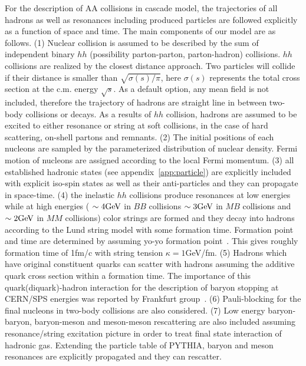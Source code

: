 \documentclass[]{article}
\newcommand{\srt}{\mbox{$\sqrt{s}$}}
\def\GeV{\mbox{\rm GeV}}
\begin{document}
For the description of AA collisions in  cascade model,
 the trajectories of all hadrons as well as resonances
 including produced particles are followed explicitly
   as a function of space and time.
The main components of our model are as follows.
(1)  Nuclear collision is assumed to be described by the
   sum of independent binary $hh$ 
   (possibility parton-parton, parton-hadron)
   collisions.
   $hh$ collisions are realized by the closest distance approach.
  Two particles will collide if their distance is smaller than
  $\sqrt{\sigma(s)/\pi}$, here $\sigma(s)$ represents the total cross
  section at the c.m. energy $\srt$.
  As a default option, any mean field is not included, therefore 
  the trajectory of hadrons are straight line in between two-body
  collisions or decays.
  As a results of $hh$ collision, hadrons are assumed to be
  excited to either resonance or string at soft collisions,
  in the case of hard scattering, on-shell partons and remnants.
(2) The initial positions of each nucleons are sampled by the
    parameterized distribution of nuclear density.
   Fermi motion of nucleons are assigned
   according to the local Fermi momentum.
(3) all established hadronic states (see appendix~\ref{app:particle})
    are explicitly included
    with explicit iso-spin states as well as their anti-particles
   and they can propagate in space-time.
(4) the inelastic $hh$ collisions produce resonances at low energies
   while at high energies
   ( $\sim 4\GeV$ in $BB$ collisions $\sim 3\GeV$ in $MB$ collisions
    and $\sim 2\GeV$ in $MM$ collisions)
  color strings are formed and they decay into hadrons according to the
  Lund string model with some formation time.
 Formation point and time are determined
  by assuming yo-yo formation point~\cite{bialas}.
 This gives roughly formation time of 1fm/c
  with string tension $\kappa=1$GeV/fm.
(5)
Hadrons which have original constituent quarks can scatter with hadrons
  assuming the additive quark cross section within a formation time.
The importance of this quark(diquark)-hadron interaction
 for the description of baryon stopping
at CERN/SPS energies was reported by Frankfurt group~\cite{rqmd1,urqmd}.
(6) Pauli-blocking for the final nucleons in two-body collisions
    are also considered.
(7)
 Low energy baryon-baryon, baryon-meson and  meson-meson rescattering
 are also included assuming resonance/string excitation picture
 in order to treat final state interaction of hadronic gas.
Extending the particle table of PYTHIA, baryon and meson resonances
 are explicitly propagated and they can rescatter.
\end{document}
